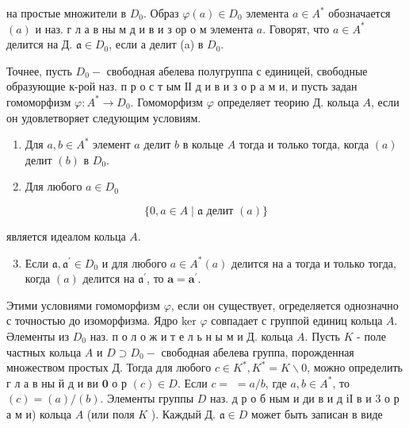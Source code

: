 \documentclass[10pt]{article}
\begin{document}
на простые множители в $D_{0}$. Образ $\varphi(a) \in D_{0}$ элемента $a \in A^{*}$ обозначается $(a)$ и наз. г л а в ны м д и в и з ор о м элемента $a$. Говорят, что $a \in A^{*}$ делится на Д. $\mathfrak{a} \in D_{0}$, если а делит (a) в $D_{0}$.



Точнее, пусть $D_{0}-$ свободная абелева полугруппа с единицей, свободные образующие к-рой наз. п р о с т ым ІІ д и в и з о р а м и, и пусть задан гомоморфизм $\varphi: A^{*} \rightarrow D_{0}$. Гомоморфизм $\varphi$ определяет теорию Д. кольца $A$, если он удовлетворяет следующим условиям.



\begin{enumerate}

  \item Для $a, b \in A^{*}$ элемент $a$ делит $b$ в кольце $A$ тогда и только тогда, когда $(a)$ делит $(b)$ в $D_{0}$.



  \item Для любого $a \in D_{0}$



\end{enumerate}



\[

\{0, a \in A \mid \mathfrak{a} \text { делит }(a)\}

\]



является идеалом кольца $A$.



\begin{enumerate}

  \setcounter{enumi}{2}

  \item Если $\mathfrak{a}, \mathfrak{a}^{\prime} \in D_{0}$ и для любого $a \in A^{*}(a)$ делится на а тогда и только тогда, когда $(a)$ делится на $\mathfrak{a}^{\prime}$, то $\mathbf{a}=\mathbf{a}^{\prime}$.

\end{enumerate}



Этими условиями гомоморфизм $\varphi$, если он существует, огределяется однозначно с точностью до изоморфизма. Ядро ker $\varphi$ совпадает с группой единиц кольца $A$. Әлементы из $D_{0}$ наз. п о л о ж и т е л ь н ы м и Д. кольца $A$. Пусть $K$ - поле частных кольца $A$ и $D \supset D_{0}-$ свободная абелева группа, порожденная множеством простых Д. Тогда для любого $c \in K^{*}, K^{*}=K \backslash 0$, можно определить г л а в ны й д и ви $\mathbf{0}$ о р $(c) \in D$. Если $c=$ $=a / b$, где $a, b \in A^{*}$, то $(c)=(a) /(b)$. Элементы группы $D$ наз. д р о б ным и ди в и д іІ в и 3 о р а м и) кольца $A$ (или поля $K$ ). Каждый Д. $\mathfrak{a} \in D$ может быть записан в виде
\end{document}
